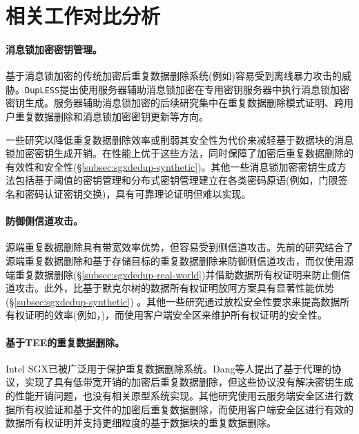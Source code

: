 \section{相关工作对比分析}
\label{sec:sgxdedup-related_work}

\paragraph*{消息锁加密密钥管理。} 基于消息锁加密\cite{bellare2013MLE}的传统加密后重复数据删除系统(例如\cite{adya2002farsite,cox2002pastiche,shah15})容易受到离线暴力攻击\cite{bellare2013DupLESS}的威胁。{\tt DupLESS}\cite{bellare2013DupLESS}提出使用服务器辅助消息锁加密在专用密钥服务器中执行消息锁加密密钥生成。服务器辅助消息锁加密的后续研究集中在重复数据删除模式证明\cite{armknecht2015transparent}、跨用户重复数据删除\cite{zhou2015secdep}和消息锁加密密钥更新\cite{qin17}等方向。

一些研究以降低重复数据删除效率\cite{zhou2015secdep,qin17}或削弱其安全性\cite{li2020Info}为代价来减轻基于数据块的消息锁加密密钥生成开销。\sysnameS 在性能上优于这些方法，同时保障了加密后重复数据删除的有效性和安全性(\S\ref{subsec:sgxdedup-synthetic})。其他一些消息锁加密密钥生成方法包括基于阈值的密钥管理\cite{duan2014distributed}和分布式密钥管理\cite{liu2015secure}建立在各类密码原语(例如，门限签名\cite{duan2014distributed}和密码认证密钥交换\cite{liu2015secure})，具有可靠理论证明但难以实现。

\paragraph*{防御侧信道攻击。}源端重复数据删除具有带宽效率优势，但容易受到侧信道攻击\cite{harnik2010side}。先前的研究\cite{harnik2010side, li15}结合了源端重复数据删除和基于存储目标的重复数据删除来防御侧信道攻击，而\sysnameS 仅使用源端重复数据删除(\S\ref{subsec:sgxdedup-real-world})并借助数据所有权证明来防止侧信道攻击。此外，\sysnameS 比基于默克尔树的数据所有权证明放阿方案具有显著性能优势(\S\ref{subsec:sgxdedup-synthetic}) 。其他一些研究通过放松安全性要求来提高数据所有权证明的效率(例如，\cite{pietro12,xu2013weak})，而\sysnameS 使用客户端安全区来维护所有权证明的安全性。

\paragraph*{基于TEE的重复数据删除。} Intel SGX\cite{sgx}已被广泛用于保护重复数据删除系统。Dang等人\cite{dang2017Privacy}提出了基于代理的协议，实现了具有低带宽开销的加密后重复数据删除，但这些协议没有解决密钥生成的性能开销问题，也没有相关原型系统实现。其他研究使用云服务端安全区进行数据所有权验证\cite{you2020Proofs}和基于文件的加密后重复数据删除\cite{fuhry2020segshare}，而\sysnameS 使用客户端安全区进行有效的数据所有权证明并支持更细粒度的基于数据块的重复数据删除。
